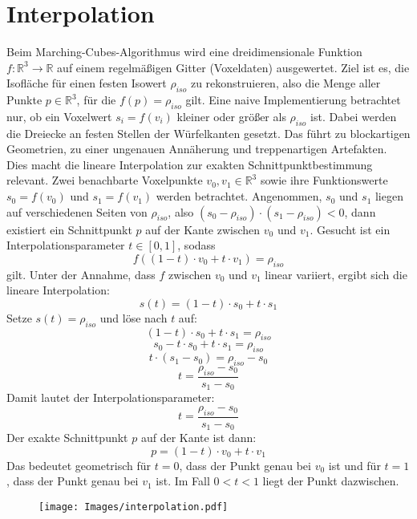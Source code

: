 \documentclass[12pt]{article}
\begin{document}
\section{Interpolation}
Beim Marching-Cubes-Algorithmus wird eine dreidimensionale Funktion $f: \mathbb{R}^3 \to \mathbb{R}$ auf einem regelmäßigen Gitter (Voxeldaten) ausgewertet.
Ziel ist es, die Isofläche für einen festen Isowert $\rho_{iso}$ zu rekonstruieren, also die Menge aller Punkte $p \in \mathbb{R}^3$, für die $f(p) = \rho_{iso}$ gilt.
Eine naive Implementierung betrachtet nur, ob ein Voxelwert $s_i = f(v_i)$ kleiner oder größer als $\rho_{iso}$ ist. Dabei werden die Dreiecke an festen Stellen der Würfelkanten gesetzt.
Das führt zu blockartigen Geometrien, zu einer ungenauen Annäherung und treppenartigen Artefakten.
Dies macht die lineare Interpolation zur exakten Schnittpunktbestimmung relevant.
Zwei benachbarte Voxelpunkte $v_0, v_1 \in \mathbb{R}^3$ sowie ihre Funktionswerte $s_0 = f(v_0)$ und $s_1 = f(v_1)$ werden betrachtet.
Angenommen, $s_0$ und $s_1$ liegen auf verschiedenen Seiten von $\rho_{iso}$, also $(s_0 - \rho_{iso}) \cdot (s_1 - \rho_{iso}) < 0$, dann existiert ein Schnittpunkt $p$ auf der Kante zwischen $v_0$ und $v_1$.
Gesucht ist ein Interpolationsparameter $t \in [0,1]$, sodass
\[
f((1 - t) \cdot v_0 + t \cdot v_1) = \rho_{iso}
\]
gilt.
Unter der Annahme, dass $f$ zwischen $v_0$ und $v_1$ linear variiert, ergibt sich die lineare Interpolation:
\[
s(t) = (1 - t) \cdot s_0 + t \cdot s_1
\]
Setze $s(t) = \rho_{iso}$ und löse nach $t$ auf:
\[
(1 - t) \cdot s_0 + t \cdot s_1 = \rho_{iso}
\]
\[
s_0 - t \cdot s_0 + t \cdot s_1 = \rho_{iso}
\]
\[
t \cdot (s_1 - s_0) = \rho_{iso} - s_0
\]
\[
t = \frac{\rho_{iso} - s_0}{s_1 - s_0}
\]
Damit lautet der Interpolationsparameter:
\[
t = \frac{\rho_{iso} - s_0}{s_1 - s_0}
\]
Der exakte Schnittpunkt $p$ auf der Kante ist dann:
\[
p = (1 - t) \cdot v_0 + t \cdot v_1
\]
Das bedeutet geometrisch für $t = 0$, dass der Punkt genau bei $v_0$ ist und für $t = 1$, dass der Punkt genau bei $v_1$ ist.
Im Fall $0 < t < 1$ liegt der Punkt dazwischen.
\begin{figure}[h]
    \centering
    \texttt{[image: Images/interpolation.pdf]}
\end{figure}
\newpage
\end{document}
